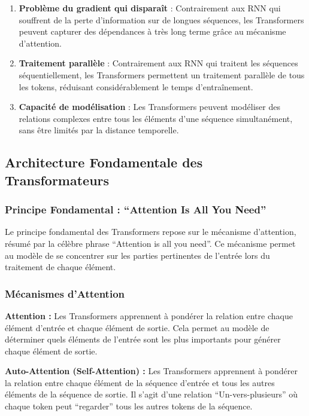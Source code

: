 \begin{enumerate}
    \item \textbf{Problème du gradient qui disparaît} : Contrairement aux RNN qui souffrent de la perte d'information sur de longues séquences, les Transformers peuvent capturer des dépendances à très long terme grâce au mécanisme d'attention.
    
    \item \textbf{Traitement parallèle} : Contrairement aux RNN qui traitent les séquences séquentiellement, les Transformers permettent un traitement parallèle de tous les tokens, réduisant considérablement le temps d'entraînement.
    
    \item \textbf{Capacité de modélisation} : Les Transformers peuvent modéliser des relations complexes entre tous les éléments d'une séquence simultanément, sans être limités par la distance temporelle.
\end{enumerate}

\subsection{Architecture Fondamentale des Transformateurs}

\subsubsection{Principe Fondamental : \enquote{Attention Is All You Need}}

Le principe fondamental des Transformers repose sur le mécanisme d'attention, résumé par la célèbre phrase \enquote{Attention is all you need}. Ce mécanisme permet au modèle de se concentrer sur les parties pertinentes de l'entrée lors du traitement de chaque élément.

\subsubsection{Mécanismes d'Attention}

\textbf{Attention :}
Les Transformers apprennent à pondérer la relation entre chaque élément d'entrée et chaque élément de sortie. Cela permet au modèle de déterminer quels éléments de l'entrée sont les plus importants pour générer chaque élément de sortie.

\textbf{Auto-Attention (Self-Attention) :}
Les Transformers apprennent à pondérer la relation entre chaque élément de la séquence d'entrée et tous les autres éléments de la séquence de sortie. Il s'agit d'une relation \enquote{Un-vers-plusieurs} où chaque token peut \enquote{regarder} tous les autres tokens de la séquence.

